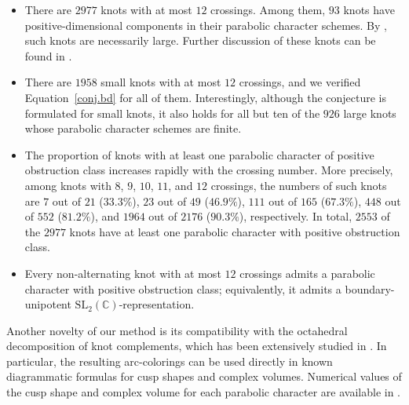 \documentclass[12pt,reqno]{amsart}
\newcommand{\BC}{\mathbb{C}}
\theoremstyle{definition}
\begin{document}
	\begin{itemize}
		\item There are $2977$ knots with at most $12$ crossings. Among them, $93$ knots have positive-dimensional components in their parabolic character schemes. By \cite{culler_varieties_1983}, such knots are necessarily large. Further discussion of these knots can be found in \cite{CPY26}.
			
		\item There are $1958$ small knots with at most $12$ crossings, and we verified Equation~\eqref{conj.bd} for all of them. Interestingly, although the conjecture is formulated for small knots, it also holds for all but ten of the $926$ large knots whose parabolic character schemes are finite.
		
		\item The proportion of knots with at least one parabolic character of positive obstruction class increases rapidly with the crossing number. More precisely, among knots with $8$, $9$, $10$, $11$, and $12$ crossings, the numbers of such knots are $7$ out of $21$ ($33.3\%$), $23$ out of $49$ ($46.9\%$), $111$ out of $165$ ($67.3\%$), $448$ out of $552$ ($81.2\%$), and $1964$ out of $2176$ ($90.3\%$), respectively. In total, $2553$ of the $2977$ knots have at least one parabolic character with positive obstruction class.
		
		\item Every non-alternating knot with at most $12$ crossings admits a parabolic character with positive obstruction class; equivalently, it admits a boundary-unipotent $\mathrm{SL}_2(\BC)$-representation.
	\end{itemize}
	
    Another novelty of our method is its compatibility with the octahedral decomposition of knot complements, which has been extensively studied in \cite{kim_octahedral_2018,kim_octahedral_2019,mcphail-snyder_hyperbolic_2022,Mc25}. In particular, the resulting arc-colorings can be used directly in known diagrammatic formulas for cusp shapes and complex volumes. Numerical values of the cusp shape and complex volume for each parabolic character are available in \cite{diagramsite}. 

	
		
\end{document}
